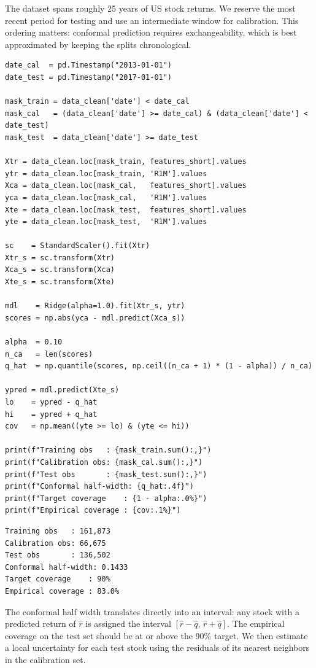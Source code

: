 The dataset spans roughly 25 years of US stock returns. We reserve the most recent period for testing and use an intermediate window for calibration. This ordering matters: conformal prediction requires exchangeability, which is best approximated by keeping the splits chronological.

\begin{verbatim}
date_cal  = pd.Timestamp("2013-01-01")
date_test = pd.Timestamp("2017-01-01")

mask_train = data_clean['date'] < date_cal
mask_cal   = (data_clean['date'] >= date_cal) & (data_clean['date'] < date_test)
mask_test  = data_clean['date'] >= date_test

Xtr = data_clean.loc[mask_train, features_short].values
ytr = data_clean.loc[mask_train, 'R1M'].values
Xca = data_clean.loc[mask_cal,   features_short].values
yca = data_clean.loc[mask_cal,   'R1M'].values
Xte = data_clean.loc[mask_test,  features_short].values
yte = data_clean.loc[mask_test,  'R1M'].values

sc    = StandardScaler().fit(Xtr)
Xtr_s = sc.transform(Xtr)
Xca_s = sc.transform(Xca)
Xte_s = sc.transform(Xte)

mdl    = Ridge(alpha=1.0).fit(Xtr_s, ytr)
scores = np.abs(yca - mdl.predict(Xca_s))

alpha  = 0.10
n_ca   = len(scores)
q_hat  = np.quantile(scores, np.ceil((n_ca + 1) * (1 - alpha)) / n_ca)

ypred = mdl.predict(Xte_s)
lo    = ypred - q_hat
hi    = ypred + q_hat
cov   = np.mean((yte >= lo) & (yte <= hi))

print(f"Training obs   : {mask_train.sum():,}")
print(f"Calibration obs: {mask_cal.sum():,}")
print(f"Test obs       : {mask_test.sum():,}")
print(f"Conformal half-width: {q_hat:.4f}")
print(f"Target coverage    : {1 - alpha:.0%}")
print(f"Empirical coverage : {cov:.1%}")
\end{verbatim}

\begin{verbatim}
Training obs   : 161,873
Calibration obs: 66,675
Test obs       : 136,502
Conformal half-width: 0.1433
Target coverage    : 90%
Empirical coverage : 83.0%
\end{verbatim}

The conformal half width translates directly into an interval: any stock with a predicted return of $\hat{r}$ is assigned the interval $[\hat{r} - \hat{q},\, \hat{r} + \hat{q}]$. The empirical coverage on the test set should be at or above the 90\% target. We then estimate a local uncertainty for each test stock using the residuals of its nearest neighbors in the calibration set.

